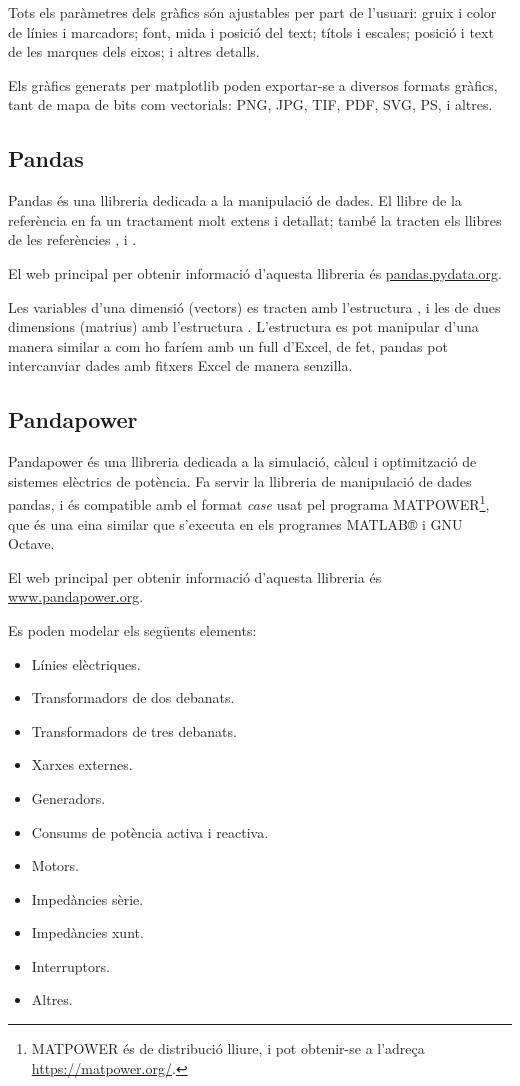 Tots els paràmetres dels gràfics són ajustables per part de l'usuari: gruix i color de línies i marcadors; font, mida i posició  del text;  títols i escales; posició i text de les marques dels eixos; i altres detalls.

Els gràfics generats per matplotlib poden exportar-se a diversos formats gràfics, tant de mapa de bits com vectorials: PNG, JPG, TIF, PDF, SVG, PS, i altres.



\subsection{Pandas}

Pandas és una llibreria dedicada a la manipulació de dades.  El llibre de la referència \cite{VAN} en fa un tractament molt extens i detallat; també la tracten els llibres de les referències \cite{JOH}, \cite{HIL} i \cite{ZUM}.


El  web principal per obtenir informació d'aquesta llibreria és \href{https://pandas.pydata.org/}{pandas.pydata.org}.

Les variables d'una dimensió (vectors) es tracten amb l'estructura , i les de dues dimensions (matrius) amb l'estructura . L'estructura  es pot manipular d'una manera similar a com ho faríem amb un full d'Excel, de fet, pandas pot intercanviar dades amb fitxers Excel de manera senzilla.


\subsection{Pandapower}

Pandapower és una llibreria dedicada a la simulació, càlcul i optimització de sistemes elèctrics de potència.  Fa servir la llibreria de manipulació de dades pandas, i és compatible amb el format \textit{case} usat pel programa MATPOWER\footnote{MATPOWER és de distribució lliure, i pot obtenir-se a l'adreça \href{https://matpower.org/}{https://matpower.org/}.}, que és una eina similar que s'executa en els programes MATLAB® i GNU Octave.

El  web principal per obtenir informació d'aquesta llibreria és \href{https://www.pandapower.org/}{www.pandapower.org}.

Es poden modelar els següents elements:
\begin{itemize}
	\item Línies elèctriques.
	\item Transformadors de dos debanats.
	\item Transformadors de tres debanats.
	\item Xarxes externes.
	\item Generadors.
	\item Consums de potència activa i reactiva.
	\item Motors.
	\item Impedàncies sèrie.
	\item Impedàncies xunt.
	\item Interruptors.
	\item Altres.
\end{itemize}

